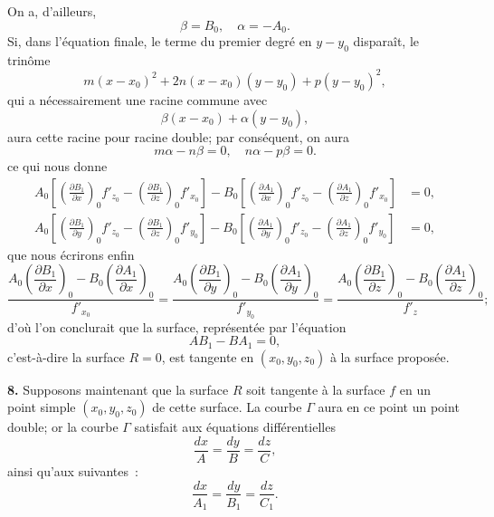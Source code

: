\documentclass{article}
\begin{document}
On a, d'ailleurs,
\[
\beta = B_{0}, \quad \alpha = - A_{0}.
\]
Si, dans l'équation finale, le terme du premier degré en $y - y_{0}$ disparaît, le trinôme
\[
m(x - x_{0})^{2} + 2n(x - x_{0})(y - y_{0}) + p(y - y_{0})^{2},
\]
qui a nécessairement une racine commune avec
\[
\beta(x - x_{0}) + \alpha(y - y_{0}),
\]
aura cette racine pour racine double; par conséquent, on aura
\[
m\alpha - n\beta = 0, \quad n\alpha - p\beta = 0.
\]
ce qui nous donne
\[
\begin{aligned}
A_{0} \left[ \left( \frac{\partial B_{1}}{\partial x} \right)_{0} f'_{z_{0}} - \left( \frac{\partial B_{1}}{\partial z} \right)_{0} f'_{x_{0}} \right] - B_{0} \left[ \left( \frac{\partial A_{1}}{\partial x} \right)_{0} f'_{z_{0}} - \left( \frac{\partial A_{1}}{\partial z} \right)_{0} f'_{x_{0}} \right] &= 0, \\
A_{0} \left[ \left( \frac{\partial B_{1}}{\partial y} \right)_{0} f'_{z_{0}} - \left( \frac{\partial B_{1}}{\partial z} \right)_{0} f'_{y_{0}} \right] - B_{0} \left[ \left( \frac{\partial A_{1}}{\partial y} \right)_{0} f'_{z_{0}} - \left( \frac{\partial A_{1}}{\partial z} \right)_{0} f'_{y_{0}} \right] &= 0,
\end{aligned}
\]
que nous écrirons enfin
\[
\frac{A_{0} \left( \dfrac{\partial B_{1}}{\partial x} \right)_{0} - B_{0} \left( \dfrac{\partial A_{1}}{\partial x} \right)_{0}}{f'_{x_{0}}} = \frac{A_{0} \left( \dfrac{\partial B_{1}}{\partial y} \right)_{0} - B_{0} \left( \dfrac{\partial A_{1}}{\partial y} \right)_{0}}{f'_{y_{0}}} = \frac{A_{0} \left( \dfrac{\partial B_{1}}{\partial z} \right)_{0} - B_{0} \left( \dfrac{\partial A_{1}}{\partial z} \right)_{0}}{f'_{z}};
\]
d'où l'on conclurait que la surface, représentée par l'équation
\[
AB_{1} - BA_{1} = 0,
\]
c'est-à-dire la surface $R = 0$, est tangente en $(x_{0}, y_{0}, z_{0})$ à la surface proposée.

\textbf{8.} Supposons maintenant que la surface $R$ soit tangente à la surface $f$ en un point simple $(x_{0}, y_{0}, z_{0})$ de cette surface. La courbe $\Gamma$ aura en ce point un point double; or la courbe $\Gamma$ satisfait aux équations différentielles
\[
\frac{dx}{A} = \frac{dy}{B} = \frac{dz}{C},
\]
ainsi qu'aux suivantes~:
\[
\frac{dx}{A_{1}} = \frac{dy}{B_{1}} = \frac{dz}{C_{1}}.
\]
\end{document}
